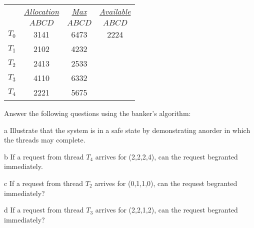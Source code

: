 \documentclass[12pt,a4paper]{article}
\newenvironment{problems}{\begin{list}{}{\renewcommand{\makelabel}[1]{\textbf{##1}\hfil}}}{\end{list}}
\newenvironment{steps}{\begin{list}{}{\renewcommand{\makelabel}[1]{##1.\hfil}}}{\end{list}}
\begin{document}
\begin{problems}
    \begin{tabular}{cccc}
        & \underline{\emph{Allocation}} & \underline{\emph{Max}} &  \underline{\emph{Available}}\\
        & $ABCD$ & $ABCD$ & $ABCD$\\
   $T_0$ & 3141 & 6473& 2224\\
   $T_1$ & 2102 & 4232& \\
   $T_2$ & 2413 & 2533& \\
   $T_3$ & 4110 & 6332& \\
   $T_4$ & 2221 & 5675&
   \end{tabular} 

   Answer the following questions using the banker's algorithm:
   \begin{steps}
       \item[a] Illustrate that the system is in a safe state by demonstrating anorder in which the threads may complete.
       \item[b] If a request from thread $T_4$ arrives for (2,2,2,4), can the request begranted immediately.
       \item[c] If a request from thread $T_2$ arrives for (0,1,1,0), can the request begranted immediately?
       \item[d] If a request from thread $T_3$ arrives for (2,2,1,2), can the request begranted immediately? 
   \end{steps}
\end{problems}
\end{document}
